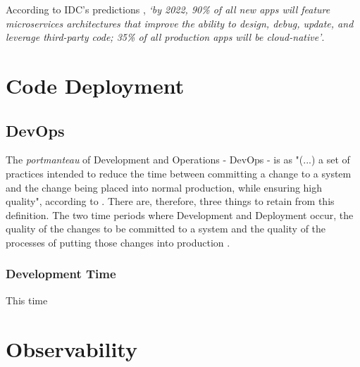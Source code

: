 According to IDC's predictions \Parencite{idc_2019}, \textit{`by 2022, 90\% of all new apps will feature microservices architectures that improve the ability to design, debug, update, and leverage third-party code; 35\% of all production apps will be cloud-native'}.













\section{Code Deployment}\label{state-of-the-art:s:code-deployment}




\subsection{DevOps}\label{state-of-the-art:ss:devops}

The \textit{portmanteau} of Development and Operations - DevOps - is as "(...) a set of practices intended to reduce the time between committing a change to a system and the change being placed into normal production, while ensuring high quality", according to \parencite{bass_weber_zhu_2015}. There are, therefore, three things to retain from this definition. The two time periods where Development and Deployment occur, the quality of the changes to be committed to a system and the quality of the processes of putting those changes into production \parencite{sallin_kropp_anslow_quilty_meier_2021}.

\subsubsection{Development Time}
This time

\section{Observability}\label{state-of-the-art:s:observability}

